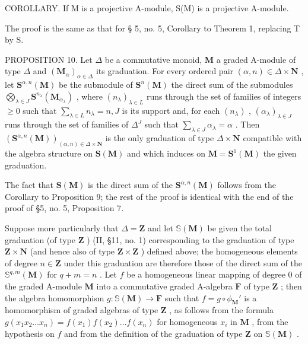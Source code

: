 COROLLARY. If M is a projective A-module, S(M) is a projective A-module.

The proof is the same as that for § 5, no. 5, Corollary to Theorem 1, replacing T by S.

PROPOSITION 10. Let \(\Delta\) be a commutative monoid, \(\mathbf{M}\) a graded A-module of type \(\Delta\) and \((\mathbf{M}_{\alpha})_{\alpha \in \Delta}\) its graduation. For every ordered pair \((\alpha, n) \in \Delta \times \mathbf{N}\) , let \(\mathbf{S}^{\alpha, n}(\mathbf{M})\) be the submodule of \(\mathbf{S}^n(\mathbf{M})\) the direct sum of the submodules \(\bigotimes_{\lambda \in J} \mathbf{S}^{n_{\lambda}}(\mathbf{M}_{\alpha_{\lambda}})\) , where \((n_{\lambda})_{\lambda \in L}\) runs through the set of families of integers \(\geqslant 0\) such that \(\sum_{\lambda \in L} n_{\lambda} = n, J\) is its support and, for each \((n_{\lambda})\) , \((\alpha_{\lambda})_{\lambda \in J}\) runs through the set of families of \(\Delta^J\) such that \(\sum_{\lambda \in J} \alpha_{\lambda} = \alpha\) . Then \((\mathbf{S}^{\alpha, n}(\mathbf{M}))_{(\alpha, n) \in \Delta \times \mathbf{N}}\) is the only graduation of type \(\Delta \times \mathbf{N}\) compatible with the algebra structure on \(\mathbf{S}(\mathbf{M})\) and which induces on \(\mathbf{M} = \mathbf{S}^1(\mathbf{M})\) the given graduation.

The fact that \(\mathbf{S}(\mathbf{M})\) is the direct sum of the \(\mathbf{S}^{\alpha,n}(\mathbf{M})\) follows from the Corollary to Proposition 9; the rest of the proof is identical with the end of the proof of §5, no. 5, Proposition 7.

Suppose more particularly that \(\Delta = \mathbf{Z}\) and let \(\mathbb{S}(\mathbf{M})\) be given the total graduation (of type \(\mathbf{Z}\) ) (II, §11, no. 1) corresponding to the graduation of type \(\mathbf{Z} \times \mathbf{N}\) (and hence also of type \(\mathbf{Z} \times \mathbf{Z}\) ) defined above; the homogeneous elements of degree \(n \in \mathbf{Z}\) under this graduation are therefore those of the direct sum of the \(\mathbb{S}^{q, m}(\mathbf{M})\) for \(q + m = n\) . Let \(f\) be a homogeneous linear mapping of degree 0 of the graded A-module \(\mathbf{M}\) into a commutative graded A-algebra \(\mathbf{F}\) of type \(\mathbf{Z}\) ; then the algebra homomorphism \(g: \mathbb{S}(\mathbf{M}) \to \mathbf{F}\) such that \(f = g \circ \phi_{\mathbf{M}}'\) is a homomorphism of graded algebras of type \(\mathbf{Z}\) , as follows from the formula \(g(x_1 x_2 \ldots x_n) = f(x_1) f(x_2) \ldots f(x_n)\) for homogeneous \(x_i\) in \(\mathbf{M}\) , from the hypothesis on \(f\) and from the definition of the graduation of type \(\mathbf{Z}\) on \(\mathbb{S}(\mathbf{M})\) .

